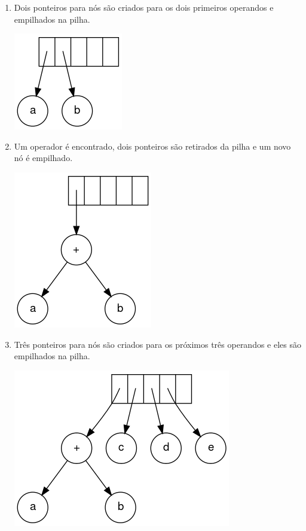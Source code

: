 \begin{enumerate}

\item Dois ponteiros para nós são criados para os dois primeiros operandos e empilhados na pilha.

\includegraphics[scale=0.5]{images/passo1.png}

\item Um operador é encontrado, dois ponteiros são retirados da pilha e um novo nó é empilhado.

\includegraphics[scale=0.5]{images/passo2.png}

\item Três ponteiros para nós são criados para os próximos três operandos e eles são empilhados na pilha.

\includegraphics[scale=0.5]{images/passo3.png}


\end{enumerate}

